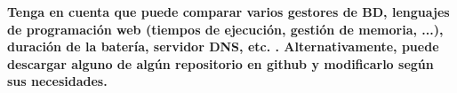 \textbf{Tenga en cuenta que puede comparar varios gestores de BD, lenguajes de programación web (tiempos de ejecución, gestión de memoria, ...), duración de la batería, servidor DNS, etc. . Alternativamente, puede descargar alguno de algún repositorio en github y modificarlo según sus necesidades.}

















